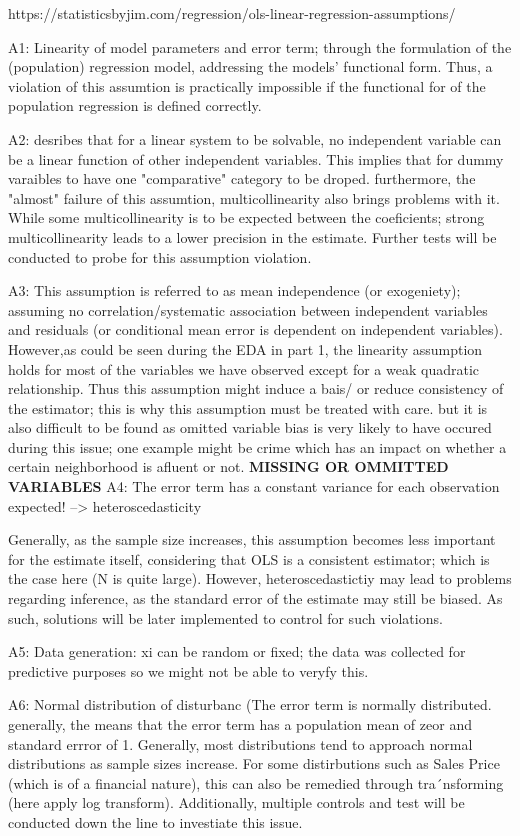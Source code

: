 \documentclass{article}
\begin{document}
https://statisticsbyjim.com/regression/ols-linear-regression-assumptions/

A1: Linearity of model parameters and error term; through the formulation of the (population) regression model, addressing the models' functional form. Thus, a violation of this assumtion is practically impossible if the functional for of the population regression is defined correctly. 

A2: desribes that for a linear system to be solvable, no independent variable can be a linear function of other independent variables. This implies that for dummy varaibles to have one "comparative" category to be droped. furthermore, the "almost" failure of this assumtion, multicollinearity also brings problems with it. While some multicollinearity is to be expected between the coeficients; strong multicollinearity leads to a lower precision in the estimate. Further tests will be conducted to probe for this assumption violation. 

A3: This assumption is referred to as mean independence (or exogeniety); assuming no correlation/systematic association between independent variables and residuals (or conditional mean error is dependent on independent variables). However,as could be seen during the EDA in part 1, the linearity assumption holds for most of the variables we have observed except for a weak quadratic relationship. 
Thus this assumption might induce a bais/ or reduce consistency of the estimator; this is why this assumption must be treated with care. but it is also difficult to be found as omitted variable bias is very likely to have occured during this issue; one example might be crime which has an impact on whether a certain neighborhood is afluent or not.
\textbf{MISSING OR OMMITTED VARIABLES}
A4: The error term has a constant variance for each observation expected! --> heteroscedasticity

Generally, as the sample size increases, this assumption becomes less important for the estimate itself, considering that OLS is a consistent estimator; which is the case here (N is quite large). However, heteroscedastictiy may lead to problems regarding inference, as the standard error of the estimate may still be biased. As such, solutions will be later implemented to control for such violations.


A5: Data generation: xi can be random or fixed; the data was collected for predictive purposes so we might not be able to veryfy this.

A6: Normal distribution of disturbanc (The error term is normally distributed. generally, the means that the error term has a population mean of zeor and standard errror of 1. Generally, most distributions tend to approach normal distributions as sample sizes increase. For some distirbutions such as Sales Price (which is of a financial nature), this can also be remedied through tra´nsforming (here apply log transform). Additionally, multiple controls and test will be conducted down the line to investiate this issue.
\end{document}
